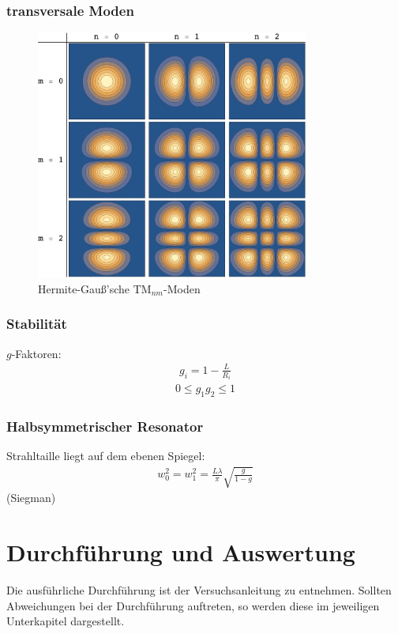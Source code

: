 \documentclass[11pt, a4paper]{article}
\numberwithin{equation}{section}
\begin{document}
\subsubsection{transversale Moden}
\begin{figure}[h]
	\centering
	\includegraphics[width=0.8\textwidth]{./figures/transversalmoden.png}
	\caption{Hermite-Gauß'sche $\mathrm{TM}_{nm}$-Moden}
	\label{fig:transversalmoden}
\end{figure}

\subsubsection{Stabilität}
$g$-Faktoren:
\begin{align}
	g_i = 1 - \frac{L}{R_i}
\end{align}
\begin{align}
	0 \le g_1 g_2 \le 1
\end{align}
\subsubsection{Halbsymmetrischer Resonator}
Strahltaille liegt auf dem ebenen Spiegel:
\begin{align}
	w_0^2 = w_1^2 = \frac{L \lambda}{\pi} \sqrt{\frac{g}{1 - g}}
	\label{eq:strahltaille_halbsym}
\end{align} (Siegman)


\section{Durchführung und Auswertung}
Die ausführliche Durchführung ist der Versuchsanleitung \cite{anleitung} zu entnehmen.
Sollten Abweichungen bei der Durchführung auftreten, so werden diese im jeweiligen Unterkapitel dargestellt.
\end{document}
